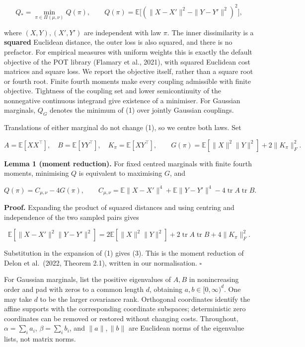 \documentclass[
  british,
  11pt,
  a4paper,
]{article}
\begin{document}
\[
Q_* = \min_{\pi\in\Pi(\mu,\nu)}Q(\pi),\qquad
Q(\pi)=\mathbb E\big[(\|X-X'\|^2-\|Y-Y'\|^2)^2\big],                 \tag{1}
\]

where \((X,Y),(X',Y')\) are independent with law \(\pi\). The inner
dissimilarity is a \textbf{squared} Euclidean distance, the outer loss
is also squared, and there is no prefactor. For empirical measures with
uniform weights this is exactly the default objective of the POT library
(Flamary et al., 2021), with squared Euclidean cost matrices and square
loss. We report the objective itself, rather than a square root or
fourth root. Finite fourth moments make every coupling admissible with
finite objective. Tightness of the coupling set and lower semicontinuity
of the nonnegative continuous integrand give existence of a minimiser.
For Gaussian marginals, \(Q_G\) denotes the minimum of (1) over jointly
Gaussian couplings.

Translations of either marginal do not change (1), so we centre both
laws. Set

\[
A=\mathbb E[XX^\top],\quad B=\mathbb E[YY^\top],\quad
K_\pi=\mathbb E[XY^\top],\qquad
G(\pi)=\mathbb E[\|X\|^2\|Y\|^2]+2\|K_\pi\|_F^2.                \tag{2}
\]

\textbf{Lemma 1 (moment reduction).} For fixed centred marginals with
finite fourth moments, minimising \(Q\) is equivalent to maximising
\(G\), and

\[
Q(\pi)=C_{\mu,\nu}-4G(\pi),\qquad
C_{\mu,\nu}=\mathbb E\|X-X'\|^4+\mathbb E\|Y-Y'\|^4
             -4\operatorname{tr}A\operatorname{tr}B.              \tag{3}
\]

\textbf{Proof.} Expanding the product of squared distances and using
centring and independence of the two sampled pairs gives

\[
\mathbb E[\|X-X'\|^2\|Y-Y'\|^2]
=2\mathbb E[\|X\|^2\|Y\|^2]
 +2\operatorname{tr}A\operatorname{tr}B+4\|K_\pi\|_F^2.
\]

Substitution in the expansion of (1) gives (3). This is the moment
reduction of Delon et al.~(2022, Theorem 2.1), written in our
normalisation. \(\square\)

For Gaussian marginals, list the positive eigenvalues of \(A,B\) in
nonincreasing order and pad with zeros to a common length \(d\),
obtaining \(a,b\in[0,\infty)^d\). One may take \(d\) to be the larger
covariance rank. Orthogonal coordinates identify the affine supports
with the corresponding coordinate subspaces; deterministic zero
coordinates can be removed or restored without changing costs.
Throughout, \(\alpha=\sum_ia_i\), \(\beta=\sum_ib_i\), and
\(\|a\|,\|b\|\) are Euclidean norms of the eigenvalue lists, not matrix
norms.
\end{document}
